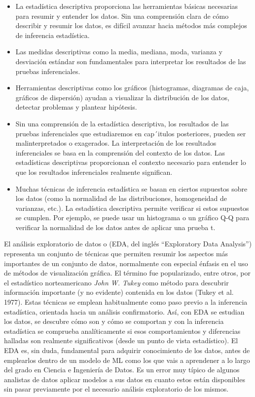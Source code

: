 \documentclass[
  letterpaper,
  DIV=11,
  numbers=noendperiod]{scrreprt}
\begin{document}
\begin{itemize}
\item
  La estadística descriptiva proporciona las herramientas básicas
  necesarias para resumir y entender los datos. Sin una comprensión
  clara de cómo describir y resumir los datos, es difícil avanzar hacia
  métodos más complejos de inferencia estadística.
\item
  Las medidas descriptivas como la media, mediana, moda, varianza y
  desviación estándar son fundamentales para interpretar los resultados
  de las pruebas inferenciales.
\item
  Herramientas descriptivas como los gráficos (histogramas, diagramas de
  caja, gráficos de dispersión) ayudan a visualizar la distribución de
  los datos, detectar problemas y plantear hipótesis.
\item
  Sin una comprensión de la estadística descriptiva, los resultados de
  las pruebas inferenciales que estudiaremos en cap´itulos posteriores,
  pueden ser malinterpretados o exagerados. La interpretación de los
  resultados inferenciales se basa en la comprensión del contexto de los
  datos. Las estadísticas descriptivas proporcionan el contexto
  necesario para entender lo que los resultados inferenciales realmente
  significan.
\item
  Muchas técnicas de inferencia estadística se basan en ciertos
  supuestos sobre los datos (como la normalidad de las distribuciones,
  homogeneidad de varianzas, etc.). La estadística descriptiva permite
  verificar si estos supuestos se cumplen. Por ejemplo, se puede usar un
  histograma o un gráfico Q-Q para verificar la normalidad de los datos
  antes de aplicar una prueba t.
\end{itemize}

El análisis exploratorio de datos o (EDA, del inglés ``Exploratory Data
Analysis'') representa un conjunto de técnicas que permiten resumir los
aspectos más importantes de un conjunto de datos, normalmente con
especial énfasis en el uso de métodos de visualización gráfica. El
término fue popularizado, entre otros, por el estadístico norteamericano
\emph{John W. Tukey} como método para descubrir información importante
(y no evidente) contenida en los datos (Tukey et al. 1977). Estas
técnicas se emplean habitualmente como paso previo a la inferencia
estadística, orientada hacia un análisis confirmatorio. Así, con EDA se
estudian los datos, se descubre cómo son y cómo se comportan y con la
inferencia estadística se comprueba analíticamente si esos
comportamientos y diferencias halladas son realmente significativos
(desde un punto de vista estadístico). El EDA es, sin duda, fundamental
para adquirir conocimiento de los datos, antes de emplearlos dentro de
un modelo de ML como los que vais a aprendener a lo largo del grado en
Ciencia e Ingeniería de Datos. Es un error muy típico de algunos
analistas de datos aplicar modelos a sus datos en cuanto estos están
disponibles sin pasar previamente por el necesario análisis exploratorio
de los mismos.
\end{document}
